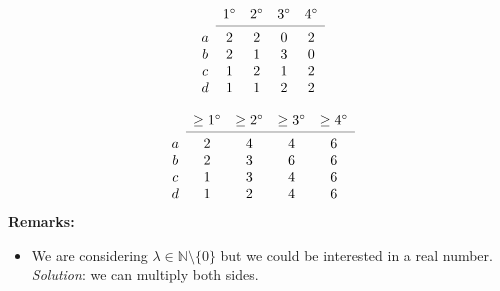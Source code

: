 \documentclass[12pt]{article}
\begin{document}
\[
\begin{array}{ccccc}
& 1^\circ
& 2^\circ
& 3^\circ
& 4^\circ \\
\cmidrule{2-5}
a 
& 2
& 2
& 0
& 2 \\
b
& 2
& 1
& 3
& 0 \\
c
& 1
& 2
& 1
& 2 \\
d
& 1
& 1
& 2
& 2 \\
\end{array}
\]

\[
\begin{array}{ccccc}
& \geq 1^\circ
& \geq 2^\circ
& \geq 3^\circ
& \geq 4^\circ \\
\cmidrule{2-5}
a 
& 2
& 4
& 4
& 6 \\
b
& 2
& 3
& 6
& 6 \\
c
& 1
& 3
& 4
& 6 \\
d
& 1
& 2
& 4
& 6 \\
\end{array}
\]
\textbf{Remarks:}
\begin{itemize}
	\item We are considering $\lambda \in \mathbb{N} \setminus \{0\}$ but we could be interested in a real number. \textit{Solution}: we can multiply both sides.
\end{itemize}
\fi
\end{document}
